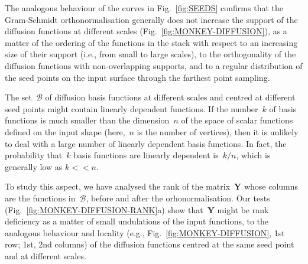 \documentclass[acmtog,authorversion]{acmart}
\begin{document}
The analogous behaviour of the curves in Fig.~\ref{fig:SEEDS} confirms that the Gram-Schmidt orthonormalisation generally does not increase the support of the diffusion functions at different scales (Fig.~\ref{fig:MONKEY-DIFFUSION}), as a matter of the ordering of the functions in the stack with respect to an increasing size of their support (i.e., from small to large scales), to the orthogonality of the diffusion functions with non-overlapping supports, and to a regular distribution of the seed points on the input surface through the farthest point sampling.

The set~$\mathcal{B}$ of diffusion basis functions at different scales and centred at different seed points might contain linearly dependent functions. If the number~$k$ of basis functions is much smaller than the dimension~$n$ of the space of scalar functions defined on the input shape (here,~$n$ is the number of vertices), then it is unlikely to deal with a large number of linearly dependent basis functions. In fact, the probability that~$k$ basis functions are linearly dependent is~$k/n$, which is generally low as \mbox{$k<<n$}. 

To study this aspect, we have analysed the rank of the matrix~$\mathbf{Y}$ whose columns are the functions in~$\mathcal{B}$, before and after the orhonormalisation. Our tests (Fig.~\ref{fig:MONKEY-DIFFUSION-RANK}a) show that~$\mathbf{Y}$ might be rank deficiency as a matter of small undulations of the input functions, to the analogous behaviour and locality (e.g., Fig.~\ref{fig:MONKEY-DIFFUSION}, 1st row; 1st, 2nd columns) of the diffusion functions centred at the same seed point and at different scales.
\end{document}
